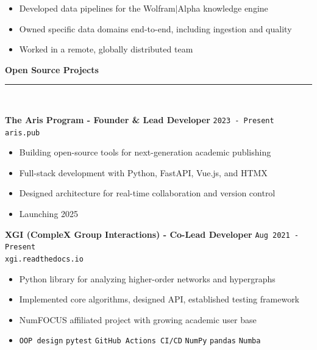\documentclass[11pt,a4paper]{article}
\newcommand{\sectiondivider}{%
    \vspace{2pt}\\%
    {\color{verdigris}\rule{30pt}{2pt}}\\%
    \vspace{8pt}%
}
\newcommand{\verdigrisbullet}{{\color{verdigris}$\bullet$}\space}
\newcommand{\techtag}[1]{%
    \textcolor{verdigris}{\texttt{\small #1}}%
}
\newcommand{\jobduration}[1]{%
    \textcolor{mediumgray}{\texttt{\small #1}}%
}
\newcommand{\cvsectioncustom}[1]{%
    \vspace{12pt}%
    {\Large\color{navy}\textbf{#1}}%
    \sectiondivider%
}
\begin{document}
\begin{itemize}[leftmargin=15pt,itemsep=3pt]
    \item[\verdigrisbullet] Developed data pipelines for the Wolfram$|$Alpha knowledge engine
    \item[\verdigrisbullet] Owned specific data domains end-to-end, including ingestion and quality
    \item[\verdigrisbullet] Worked in a remote, globally distributed team
\end{itemize}

\cvsectioncustom{Open Source Projects}

\textbf{\large\color{navy}The Aris Program - Founder \& Lead Developer} \hfill \jobduration{2023 - Present}\\
{\textcolor{verdigris}{\texttt{aris.pub}}}

\begin{itemize}[leftmargin=15pt,itemsep=3pt]
    \item[\verdigrisbullet] Building open-source tools for next-generation academic publishing
    \item[\verdigrisbullet] Full-stack development with Python, FastAPI, Vue.js, and HTMX
    \item[\verdigrisbullet] Designed architecture for real-time collaboration and version control
    \item[\verdigrisbullet] Launching 2025
\end{itemize}

\vspace{6pt}

\textbf{\large\color{navy}XGI (CompleX Group Interactions) - Co-Lead Developer} \hfill \jobduration{Aug 2021 - Present}\\
{\textcolor{verdigris}{\texttt{xgi.readthedocs.io}}}

\begin{itemize}[leftmargin=15pt,itemsep=3pt]
    \item[\verdigrisbullet] Python library for analyzing higher-order networks and hypergraphs
    \item[\verdigrisbullet] Implemented core algorithms, designed API, established testing framework
    \item[\verdigrisbullet] NumFOCUS affiliated project with growing academic user base
    \item[\verdigrisbullet] \techtag{OOP design} \techtag{pytest} \techtag{GitHub Actions CI/CD} \techtag{NumPy} \techtag{pandas} \techtag{Numba}
\end{itemize}
\end{document}

